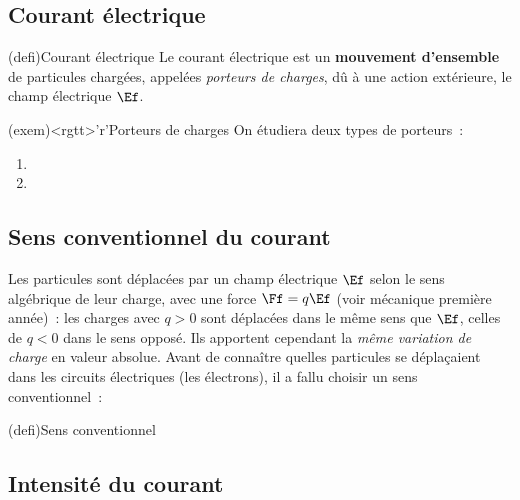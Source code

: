 \documentclass[../../main/main.tex]{subfiles}
\begin{document}
\subsection{Courant électrique}
\begin{tcbraster}[raster columns=2, raster equal height=rows]
	\begin{tcb}[label=def:courant](defi){Courant électrique}
		Le courant électrique est un \textbf{mouvement d'ensemble} de particules
		chargées, appelées \textit{porteurs de charges}, dû à une action
		extérieure, le champ électrique $\Ef$.
	\end{tcb}
	\begin{tcb}[label=exem:porteurs](exem)<rgtt>'r'{Porteurs de charges}
		On étudiera deux types de porteurs~:
		\begin{enumerate}
			\item {}%
			\item {}%
		\end{enumerate}
	\end{tcb}
\end{tcbraster}

\subsection{Sens conventionnel du courant}

Les particules sont déplacées par un champ électrique $\Ef$ selon le sens
algébrique de leur charge, avec une force $\Ff = q\Ef$ (voir mécanique
première année)~: les charges avec $q>0$ sont déplacées dans le même sens
que $\Ef$, celles de $q<0$ dans le sens opposé. Ils apportent cependant la
\textit{même variation de charge} en valeur absolue. Avant de connaître
quelles particules se déplaçaient dans les circuits électriques (les
électrons), il a fallu choisir un sens conventionnel~:
\begin{tcb*}[label=def:sensconv](defi){Sens conventionnel}
\end{tcb*}

\subsection{Intensité du courant}
\end{document}
